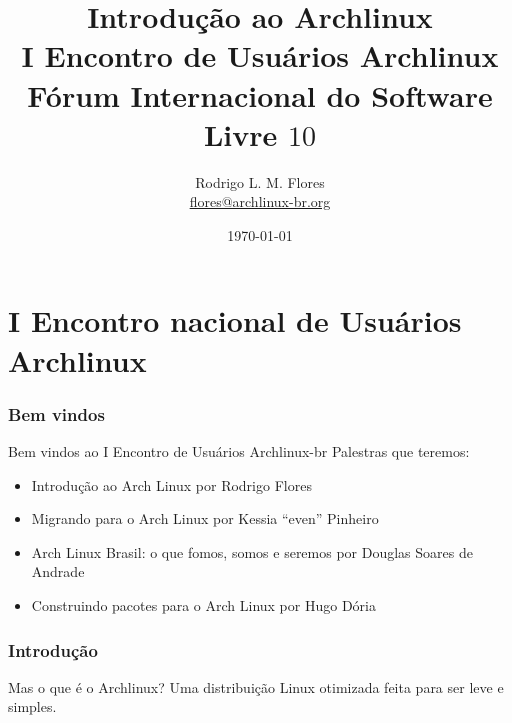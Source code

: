 \documentclass{beamer}
\title{Introdução ao Archlinux\\I Encontro de Usuários Archlinux\\Fórum Internacional do Software Livre $10$}
\author{Rodrigo L. M. Flores \\ \url{flores@archlinux-br.org}}
\institute{Projeto Archlinux-BR}
\begin{document}
\date{\today}

\frame{\titlepage}
\section{I Encontro nacional de Usuários Archlinux}


\begin{frame}
    \frametitle{Bem vindos}
    \begin{block}{Bem vindos ao I Encontro de Usuários Archlinux-br}
        Palestras que teremos:
        \begin{itemize}
            \item<1-> Introdução ao Arch Linux por Rodrigo Flores
            \item<2-> Migrando para o Arch Linux por Kessia ``even'' Pinheiro
            \item<3-> Arch Linux Brasil: o que fomos, somos e seremos por Douglas Soares de Andrade
            \item<4-> Construindo pacotes para o Arch Linux por Hugo Dória
        \end{itemize}
    \end{block}
\end{frame}


\begin{frame}
    \frametitle{Introdução}
    \begin{block}{Mas o que é o Archlinux?}
        Uma distribuição Linux otimizada feita para ser leve e simples.
    \end{block}

\end{frame}











\end{document}
